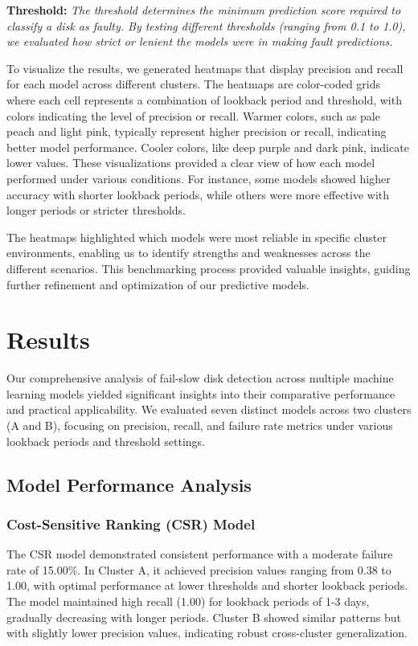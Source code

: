 \documentclass{article}
\begin{document}
\textbf{Threshold:} \textit{The threshold determines the minimum prediction score required to classify a disk as faulty. By testing different thresholds (ranging from 0.1 to 1.0), we evaluated how strict or lenient the models were in making fault predictions.}

\quad To visualize the results, we generated heatmaps that display precision and recall for each model across different clusters. The heatmaps are color-coded grids where each cell represents a combination of lookback period and threshold, with colors indicating the level of precision or recall. Warmer colors, such as pale peach and light pink, typically represent higher precision or recall, indicating better model performance. Cooler colors, like deep purple and dark pink, indicate lower values. These visualizations provided a clear view of how each model performed under various conditions. For instance, some models showed higher accuracy with shorter lookback periods, while others were more effective with longer periods or stricter thresholds.

\quad The heatmaps highlighted which models were most reliable in specific cluster environments, enabling us to identify strengths and weaknesses across the different scenarios. This benchmarking process provided valuable insights, guiding further refinement and optimization of our predictive models.

\section{Results}

Our comprehensive analysis of fail-slow disk detection across multiple machine learning models yielded significant insights into their comparative performance and practical applicability. We evaluated seven distinct models across two clusters (A and B), focusing on precision, recall, and failure rate metrics under various lookback periods and threshold settings.

\subsection{Model Performance Analysis}

\subsubsection{Cost-Sensitive Ranking (CSR) Model}
The CSR model demonstrated consistent performance with a moderate failure rate of 15.00\%. In Cluster A, it achieved precision values ranging from 0.38 to 1.00, with optimal performance at lower thresholds and shorter lookback periods. The model maintained high recall (1.00) for lookback periods of 1-3 days, gradually decreasing with longer periods. Cluster B showed similar patterns but with slightly lower precision values, indicating robust cross-cluster generalization.
\end{document}
